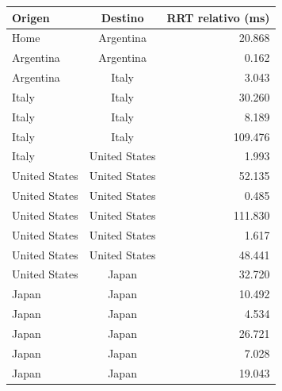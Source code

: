 \begin{center}
   \begin{tabular}{ |l | c | r | }
     \hline
     \textbf{Origen} & \textbf{Destino} & \textbf{RRT relativo (ms)} \\ \hline
     Home & Argentina & 20.868 \\ \hline
     Argentina & Argentina & 0.162 \\ \hline
     Argentina & Italy & 3.043 \\ \hline
     Italy & Italy & 30.260 \\ \hline
     Italy & Italy & 8.189 \\ \hline
     Italy & Italy & 109.476\\ \hline
     Italy & United States & 1.993\\ \hline
     United States & United States & 52.135 \\ \hline
     United States & United States & 0.485\\ \hline
     United States & United States & 111.830\\ \hline
     United States & United States & 1.617 \\ \hline
     United States & United States & 48.441 \\ \hline
     United States & Japan & 32.720 \\ \hline
     Japan & Japan & 10.492 \\ \hline
     Japan & Japan & 4.534 \\ \hline
     Japan & Japan & 26.721 \\ \hline
     Japan & Japan & 7.028 \\ \hline
     Japan & Japan & 19.043 \\ \hline
   \end{tabular}
 \end{center}
